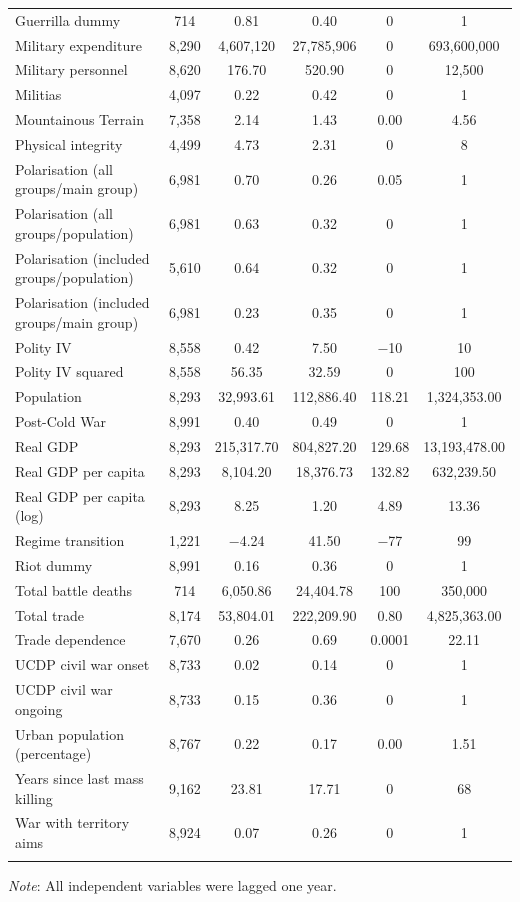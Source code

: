 \documentclass[a4paper,12pt]{article}
\begin{document}
\begin{table}[!htbp]
\begin{tabular}{@{\extracolsep{5pt}}lccccc}
Guerrilla dummy & 714 & 0.81 & 0.40 & 0 & 1 \\ 
Military expenditure & 8,290 & 4,607,120 & 27,785,906 & 0 & 693,600,000 \\ 
Military personnel & 8,620 & 176.70 & 520.90 & 0 & 12,500 \\ 
Militias & 4,097 & 0.22 & 0.42 & 0 & 1 \\ 
Mountainous Terrain & 7,358 & 2.14 & 1.43 & 0.00 & 4.56 \\ 
Physical integrity & 4,499 & 4.73 & 2.31 & 0 & 8 \\ 
Polarisation (all groups/main group) & 6,981 & 0.70 & 0.26 & 0.05 & 1 \\ 
Polarisation (all groups/population) & 6,981 & 0.63 & 0.32 & 0 & 1 \\ 
Polarisation (included groups/population) & 5,610 & 0.64 & 0.32 & 0 & 1 \\ 
Polarisation (included groups/main group) & 6,981 & 0.23 & 0.35 & 0 & 1 \\ 
Polity IV & 8,558 & 0.42 & 7.50 & $-$10 & 10 \\ 
Polity IV squared & 8,558 & 56.35 & 32.59 & 0 & 100 \\ 
Population & 8,293 & 32,993.61 & 112,886.40 & 118.21 & 1,324,353.00 \\
Post-Cold War & 8,991 & 0.40 & 0.49 & 0 & 1 \\ 
Real GDP & 8,293 & 215,317.70 & 804,827.20 & 129.68 & 13,193,478.00 \\ 
Real GDP per capita & 8,293 & 8,104.20 & 18,376.73 & 132.82 & 632,239.50 \\ 
Real GDP per capita (log) & 8,293 & 8.25 & 1.20 & 4.89 & 13.36 \\ 
Regime transition & 1,221 & $-$4.24 & 41.50 & $-$77 & 99 \\ 
Riot dummy & 8,991 & 0.16 & 0.36 & 0 & 1 \\ 
Total battle deaths & 714 & 6,050.86 & 24,404.78 & 100 & 350,000 \\  
Total trade & 8,174 & 53,804.01 & 222,209.90 & 0.80 & 4,825,363.00 \\ 
Trade dependence & 7,670 & 0.26 & 0.69 & 0.0001 & 22.11 \\ 
UCDP civil war onset & 8,733 & 0.02 & 0.14 & 0 & 1 \\ 
UCDP civil war ongoing & 8,733 & 0.15 & 0.36 & 0 & 1 \\ 
Urban population (percentage) & 8,767 & 0.22 & 0.17 & 0.00 & 1.51 \\ 
Years since last mass killing & 9,162 & 23.81 & 17.71 & 0 & 68 \\ 
War with territory aims & 8,924 & 0.07 & 0.26 & 0 & 1 \\ 
\hline \\[-1.8ex] 
\end{tabular} 
\raggedright{\newline \textit{Note}: All independent variables were lagged one year.}
\end{table} 
\normalsize
\end{document}
